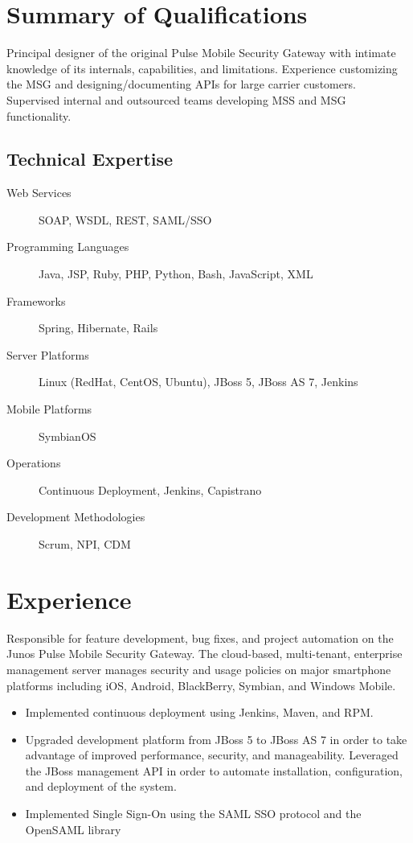 \documentclass[12pt,letter,sans]{moderncv}
\begin{document}
\makecvtitle

\section{Summary of Qualifications}

Principal designer of the original Pulse Mobile Security Gateway with intimate
knowledge of its internals, capabilities, and limitations.  Experience
customizing the MSG and designing/documenting APIs for large carrier customers.
Supervised internal and outsourced teams developing MSS and MSG functionality.

\subsection{Technical Expertise}

\begin{description}
    \item[Web Services] SOAP, WSDL, REST, SAML/SSO
    \item[Programming Languages] Java, JSP, Ruby, PHP, Python, Bash, JavaScript, XML
    \item[Frameworks] Spring, Hibernate, Rails
    \item[Server Platforms] Linux (RedHat, CentOS, Ubuntu), JBoss 5, JBoss AS 7, Jenkins
    \item[Mobile Platforms] SymbianOS
    \item[Operations] Continuous Deployment, Jenkins, Capistrano
    \item[Development Methodologies] Scrum, NPI, CDM
\end{description}

\section{Experience}


Responsible for feature development, bug fixes, and project automation on the
Junos Pulse Mobile Security Gateway.  The cloud-based, multi-tenant, enterprise
management server manages security and usage policies on major
smartphone platforms including iOS, Android, BlackBerry, Symbian, and Windows
Mobile.

\begin{itemize}

    \item Implemented continuous deployment using Jenkins, Maven, and RPM.

    \item Upgraded development platform from JBoss 5 to JBoss AS 7 in order to
        take advantage of improved performance, security, and manageability.
        Leveraged the JBoss management API in order to automate installation,
        configuration, and deployment of the system.

    \item Implemented Single Sign-On using the SAML SSO protocol and the OpenSAML
        library

\end{itemize}
\end{document}
